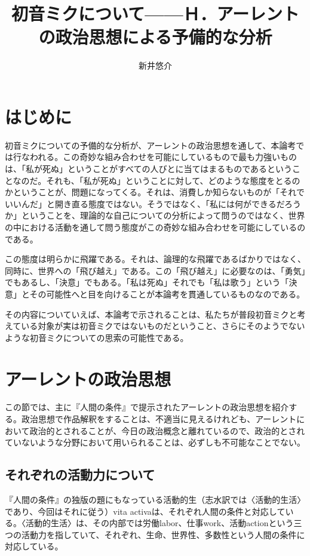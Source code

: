 \documentclass[b5j,twoside,twocolumn]{utarticle}
\title{\tbaselineshift=4pt 初音ミクについて------Ｈ．アーレントの政治思想による予備的な分析}
\author{新井悠介}
\date{\vspace{-5mm}}
\makeatletter
\def\yakuchu{%
\@ifnextchar[\@xfootnote %
{\stepcounter{yakuchu}%
\protected@xdef\@thefnmark{\theyakuchu}%
\@footnotemark\@footnotetext}}
\makeatother
\begin{document}
\maketitle

\setlength{\footskip}{-2mm}
\chead[]{}
\lfoot[]{\thepage{}}
\cfoot[]{}
\rfoot[\thepage{}]{}

\let\yakuchu=\endnote
\renewcommand{\footnoterule}{\noindent\rule{100mm}{0.3mm}\vskip2mm}
\thispagestyle{fancy}
\section*{はじめに}
初音ミクについての予備的な分析が、アーレントの政治思想を通して、本論考では行なわれる。この奇妙な組み合わせを可能にしているもので最も力強いものは、「私が死ぬ」ということがすべての人びとに当てはまるものであるということなのだ。それも、「私が死ぬ」ということに対して、どのような態度をとるのかということが、問題になってくる。それは、消費しか知らないものが「それでいいんだ」と開き直る態度ではない。そうではなく、「私には何ができるだろうか」ということを、理論的な自己についての分析によって問うのではなく、世界の中における活動を通して問う態度がこの奇妙な組み合わせを可能にしているのである。


この態度は明らかに飛躍である。それは、論理的な飛躍であるばかりではなく、同時に、世界への「飛び越え」である。この「飛び越え」に必要なのは、「勇気」でもあるし、「決意」でもある。「私は死ぬ」それでも「私は歌う」という「決意」とその可能性へと目を向けることが本論考を貫通しているものなのである。


その内容についていえば、本論考で示されることは、私たちが普段初音ミクと考えている対象が実は初音ミクではないものだということ、さらにそのようでないような初音ミクについての思索の可能性である。
\setcounter{section}{0}
\section{アーレントの政治思想}
この節では、主に『人間の条件』で提示されたアーレントの政治思想を紹介する。政治思想で作品解釈をすることは、不適当に見えるけれども、アーレントにおいて政治的とされることが、今日の政治概念と離れているので、政治的とされていないような分野において用いられることは、必ずしも不可能なことでない。


\subsection{それぞれの活動力について}
『人間の条件』の独版の題にもなっている活動的生（志水訳では〈活動的生活〉であり、今回はそれに従う）vita activaは、それぞれ人間の条件と対応している。〈活動的生活〉は、その内部では労働labor、仕事work、活動actionという三つの活動力を指していて、それぞれ、生命、世界性、多数性という人間の条件に対応している。
\end{document}
